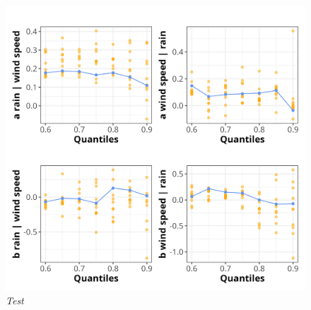 \documentclass{article}
\numberwithin{equation}{section}
\begin{document}
\begin{figure}[H]
    \centering
    \includegraphics[width = 0.9\linewidth]{plots/042_bootstrap_thresh.png}
    \caption{\emph{Test}}
    \label{fig:04_bootstrap_thresh}
\end{figure}

% 
% 
\end{document}
